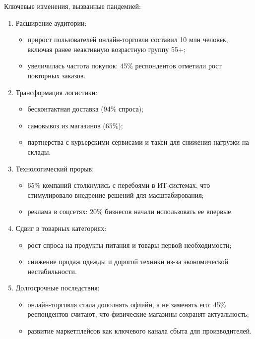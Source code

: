 Ключевые изменения, вызванные пандемией:
\begin{enumerate}
	\item Расширение аудитории:
	\begin{itemize}
		\item прирост пользователей онлайн-торговли составил 10 млн человек, включая ранее неактивную возрастную группу 55+;
		\item увеличилась частота покупок: 45\% респондентов отметили рост повторных заказов.
	\end{itemize}
	
	\item Трансформация логистики:
	\begin{itemize}
		\item бесконтактная доставка (94\% спроса);
		\item самовывоз из магазинов (65\%);
		\item партнерства с курьерскими сервисами и такси для снижения нагрузки на склады.
	\end{itemize}
	
	\item Технологический прорыв:
	\begin{itemize}
		\item 65\% компаний столкнулись с перебоями в ИТ-системах, что стимулировало внедрение решений для масштабирования;
		\item реклама в соцсетях: 20\% бизнесов начали использовать ее впервые.
	\end{itemize}
	
	\item Сдвиг в товарных категориях:
	\begin{itemize}
		\item рост спроса на продукты питания и товары первой необходимости;
		\item снижение продаж одежды и дорогой техники из-за экономической нестабильности.
	\end{itemize}
	
	\item Долгосрочные последствия:
	\begin{itemize}
		\item онлайн-торговля стала дополнять офлайн, а не заменять его: 45\% респондентов считают, что физические магазины сохранят актуальность;
		\item развитие маркетплейсов как ключевого канала сбыта для производителей.
	\end{itemize}
	
\end{enumerate}

